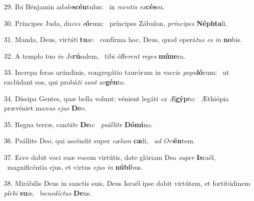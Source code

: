 29. Ibi Bénjamin ad\textit{o}\textit{le}\textbf{scén}tulus: \ast\  in \textit{men}\textit{tis} \textit{ex}\textbf{cés}su.\

30. Príncipes Juda, du\textit{ces} \textit{e}\textbf{ó}rum: \ast\  príncipes Zábulon, \textit{prín}\textit{ci}\textit{pes} \textbf{Néph}\textbf{ta}li.\

31. Manda, Deus, vir\textit{tú}\textit{ti} \textbf{tu}æ: \ast\  confírma hoc, Deus, quod operá\textit{tus} \textit{es} \textit{in} \textbf{no}bis.\

32. A templo tuo \textit{in} \textit{Je}\textbf{rú}salem, \ast\  tibi óffe\textit{rent} \textit{re}\textit{ges} \textbf{mú}\textbf{ne}ra.\

33. Increpa feras arúndinis, congregátio taurórum in vaccis \textit{po}\textit{pu}\textbf{ló}rum: \ast\  ut exclúdant eos, qui probá\textit{ti} \textit{sunt} \textit{ar}\textbf{gén}to.\

34. Díssipa Gentes, quæ bella volunt: vénient legáti \textit{ex} \textit{Æ}\textbf{gýp}to: \ast\  Æthiópia prævéniet ma\textit{nus} \textit{e}\textit{jus} \textbf{De}o.\

35. Regna terræ, can\textit{tá}\textit{te} \textbf{De}o: \ast\  \textit{psál}\textit{li}\textit{te} \textbf{Dó}\textbf{mi}no.\

36. Psállite Deo, qui ascéndit super \textit{cæ}\textit{lum} \textbf{cæ}li, \ast\  \textit{ad} \textit{O}\textit{ri}\textbf{én}tem.\

37. Ecce dabit voci suæ vocem virtútis, date glóriam Deo \textit{su}\textit{per} \textbf{Is}raël, \ast\  magnificéntia ejus, et virtus \textit{e}\textit{jus} \textit{in} \textbf{nú}\textbf{bi}bus.\

38. Mirábilis Deus in sanctis suis, Deus Israël ipse dabit virtútem, et fortitúdinem \textit{ple}\textit{bi} \textbf{su}æ, \ast\  be\textit{ne}\textit{díc}\textit{tus} \textbf{De}us.\

